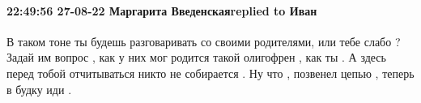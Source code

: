  
 
 
 
 

\paragraph{22:49:56 27-08-22 Маргарита Введенскаяreplied to Иван}

В таком тоне ты будешь разговаривать со своими родителями, или тебе слабо ?
Задай им вопрос , как у них мог родится такой олигофрен , как ты . А здесь
перед тобой отчитываться никто не собирается . Ну что , позвенел цепью , теперь
в будку иди .
